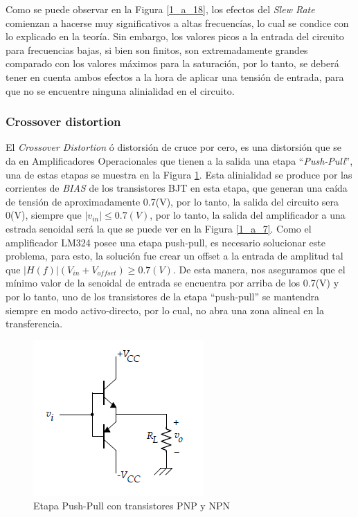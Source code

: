 Como se puede observar en la Figura \ref{1_a_18}, los efectos del
\emph{Slew Rate }comienzan a hacerse muy significativos a altas frecuencías,
lo cual se condice con lo explicado en la teoría. Sin embargo, los
valores picos a la entrada del circuito para frecuencias bajas, si
bien son finitos, son extremadamente grandes comparado con los valores
máximos para la saturación, por lo tanto, se deberá tener en cuenta
ambos efectos a la hora de aplicar una tensión de entrada, para que
no se encuentre ninguna alinialidad en el circuito. 

\subsubsection{Crossover distortion}

El \emph{Crossover Distortion} ó distorsión de cruce por cero, es
una distorsión que se da en Amplificadores Operacionales que tienen
a la salida una etapa ``\emph{Push-Pull}'', una de estas etapas
se muestra en la Figura \ref{1_a_6}. Esta alinialidad se produce
por las corrientes de \emph{BIAS} de los transistores BJT en esta
etapa, que generan una caída de tensión de aproximadamente 0.7(V),
por lo tanto, la salida del circuito sera 0(V), siempre que $\left|v_{in}\right|\leq0.7(V)$,
por lo tanto, la salida del amplificador a una estrada senoidal será
la que se puede ver en la Figura \ref{1_a_7}. Como el amplificador
LM324 posee una etapa push-pull, es necesario solucionar este problema,
para esto, la solución fue crear un offset a la entrada de amplitud
tal que $\left|H(f)\right|\left(V_{in}+V_{offset}\right)\geq0.7(V)$.
De esta manera, nos aseguramos que el mínimo valor de la senoidal
de entrada se encuentra por arriba de los 0.7(V) y por lo tanto, uno
de los transistores de la etapa ``push-pull'' se mantendra siempre
en modo activo-directo, por lo cual, no abra una zona alineal en la
transferencia.

\begin{figure}[H]
\begin{centering}
\includegraphics[scale=0.5]{../Ex1/iA/Resources1a/push-pull}
\par\end{centering}
\caption{Etapa Push-Pull con transistores PNP y NPN}
\label{1_a_6}
\end{figure}

